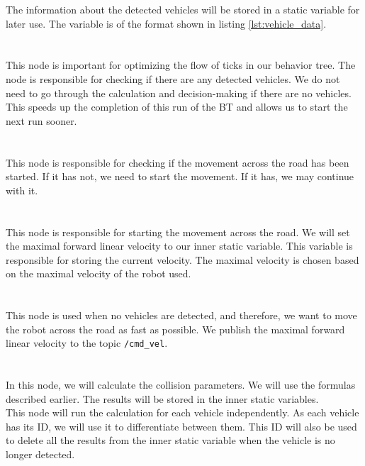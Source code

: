         The information about the detected vehicles will be stored in a static variable for later use. The variable is of the format shown in listing \ref{lst:vehicle_data}.\\\\
    \\
        This node is important for optimizing the flow of ticks in our behavior tree. The node is responsible for checking if there are any detected vehicles. We do not need to go through the calculation and decision-making if there are no vehicles. This speeds up the completion of this run of the BT and allows us to start the next run sooner.\\\\
    \\
        This node is responsible for checking if the movement across the road has been started. If it has not, we need to start the movement. If it has, we may continue with it.\\\\
    \\
        This node is responsible for starting the movement across the road. We will set the maximal forward linear velocity to our inner static variable. This variable is responsible for storing the current velocity. The maximal velocity is chosen based on the maximal velocity of the robot used.\\\\
    \\
        This node is used when no vehicles are detected, and therefore, we want to move the robot across the road as fast as possible. We publish the maximal forward linear velocity to the topic \texttt{/cmd\_vel}.\\\\
    \\
        In this node, we will calculate the collision parameters. We will use the formulas described earlier. The results will be stored in the inner static variables.\\
        This node will run the calculation for each vehicle independently. As each vehicle has its ID, we will use it to differentiate between them. This ID will also be used to delete all the results from the inner static variable when the vehicle is no longer detected.\\\\
